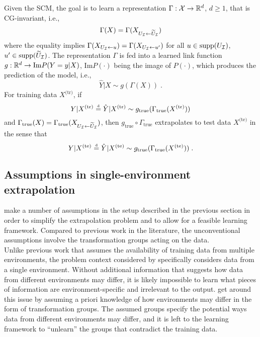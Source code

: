 Given the SCM, the goal is to learn a representation $\Gamma:\mathcal{X}\rightarrow\mathbb{R}^d$, $d\geq 1$, that is CG-invariant, i.e.,
\[
\Gamma(X) = \Gamma(X_{U_{\mathcal{I}}\leftarrow\widetilde{U}_{\mathcal{I}}})
\]
where the equality implies $\Gamma(X_{U_{\mathcal{I}}\leftarrow u})=\Gamma(X_{U_{\mathcal{I}}\leftarrow u'})$ for all $u\in\text{\rm supp}(U_{\mathcal{I}})$, $u'\in\text{\rm supp}(\widetilde{U}_{\mathcal{I}})$. The representation $\Gamma$ is fed into a learned link function $g:\mathbb{R}^d\rightarrow \text{Im} P(Y=y|X)$, $\text{Im} P(\cdot)$ being the image of $P(\cdot)$, which produces the prediction of the model, i.e.,
\[
\hat{Y}|X \sim g(\Gamma(X)) \;.
\]
For training data $X^\text{(tr)}$, if
\[
Y|X^\text{(tr)} \stackrel{\text{\rm\tiny d}}{=} \hat{Y}|X^\text{(tr)}\sim g_{\text{true}}(\Gamma_{\text{true}}(X^\text{(tr)}))
\]
and $\Gamma_\text{true}(X) = \Gamma_\text{true}(X_{U_{\mathcal{I}}\leftarrow\widetilde{U}_{\mathcal{I}}})$, then $g_\text{true}\circ\Gamma_\text{true}$ extrapolates to test data $X^\text{(te)}$ in the sense that
\[
Y|X^\text{(te)} \stackrel{\text{\rm\tiny d}}{=} \hat{Y}|X^\text{(te)}\sim g_{\text{true}}(\Gamma_{\text{true}}(X^\text{(te)})) \;.
\]


\subsection{Assumptions in single-environment extrapolation}

\textcite{Mouli:2021} make a number of assumptions in the setup described in the previous section in order to simplify the extrapolation problem and to allow for a feasible learning framework. Compared to previous work in the literature, the unconventional assumptions involve the transformation groups acting on the data.
\\

Unlike previous work that assumes the availability of training data from multiple environments, the problem context considered by \citeauthor{Mouli:2021} specifically considers data from a single environment. Without additional information that suggests how data from different environments may differ, it is likely impossible to learn what pieces of information are environment-specific and irrelevant to the output. \citeauthor{Mouli:2021} get around this issue by assuming a priori knowledge of how environments may differ in the form of transformation groups. The assumed groups specify the potential ways data from different environments may differ, and it is left to the learning framework to ``unlearn'' the groups that contradict the training data.
\\

